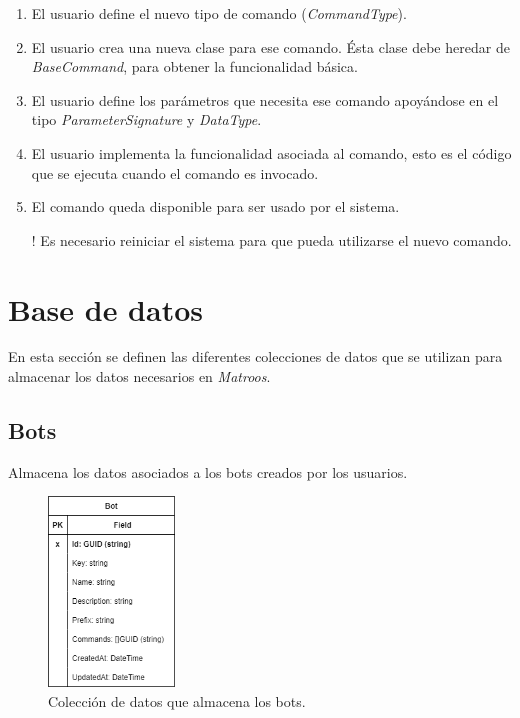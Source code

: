 \begin{enumerate}
	\item El usuario define el nuevo tipo de comando (\textit{CommandType}).
	\item El usuario crea una nueva clase para ese comando. Ésta clase debe heredar de \textit{BaseCommand}, para obtener la funcionalidad básica.
	\item El usuario define los parámetros que necesita ese comando apoyándose en el tipo \textit{ParameterSignature} y \textit{DataType}.
	\item El usuario implementa la funcionalidad asociada al comando, esto es el código que se ejecuta cuando el comando es invocado.
	\item El comando queda disponible para ser usado por el sistema.
	\item[!] Es necesario reiniciar el sistema para que pueda utilizarse el nuevo comando.
\end{enumerate}


\section{Base de datos}

En esta sección se definen las diferentes colecciones de datos que se utilizan para almacenar los datos necesarios en \textit{Matroos}.

\subsection{Bots}

Almacena los datos asociados a los bots creados por los usuarios.

\begin{figure}[H]
	\centering
	\includegraphics[width=0.3\textwidth]{img/database_architecture_bot.png}
	\caption{Colección de datos que almacena los bots.}
\end{figure}

